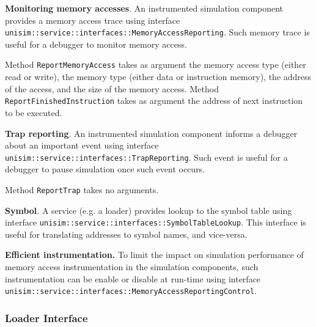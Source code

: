 \textbf{Monitoring memory accesses}. An instrumented simulation component provides a memory access trace using interface \texttt{unisim::service::interfaces::MemoryAccessReporting}.
Such memory trace is useful for a debugger to monitor memory access.

\begin{center}
	
\end{center}

Method \texttt{ReportMemoryAccess} takes as argument the memory access type (either read or write), the memory type (either data or instruction memory), the address of the access, and the size of the memory access.
Method \texttt{ReportFinishedInstruction} takes as argument the address of next instruction to be executed.

\textbf{Trap reporting}. An instrumented simulation component informs a debugger about an important event using interface \texttt{unisim::service::interfaces::TrapReporting}.
Such event is useful for a debugger to pause simulation once such event occurs.

\begin{center}
	
\end{center}

Method \texttt{ReportTrap} takes no arguments.

\textbf{Symbol}. A service (e.g. a loader) provides lookup to the symbol table using interface \texttt{unisim::service::interfaces::SymbolTableLookup}.
This interface is useful for translating addresses to symbol names, and vice-versa.

\begin{center}
	
\end{center}

\textbf{Efficient instrumentation.} To limit the impact on simulation performance of memory access instrumentation in the simulation components, such instrumentation can be enable or disable at run-time using interface \texttt{unisim::service::interfaces::MemoryAccessReportingControl}.

\begin{center}
	
\end{center}

\subsubsection{Loader Interface}

